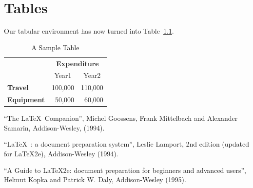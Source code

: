\documentclass[12pt,captions=tableabove]{scrbook}
\begin{document}
\appendix
\chapter{Tables}

Our tabular environment has now turned into Table~\ref{tab:sample}.

\begin{table}[htbp]
\caption{A Sample Table}
\label{tab:sample}
\centering
\begin{tabular}{lrr}
 & \multicolumn{2}{c}{\bfseries Expenditure}\\
 & \multicolumn{1}{c}{Year1} & \multicolumn{1}{c}{Year2}\\
\bfseries Travel & 100,000 & 110,000\\
\bfseries Equipment & 50,000 & 60,000
\end{tabular}
\end{table}

\begin{thebibliography}{1}
 ``The \LaTeX\ Companion'', Michel Goossens, Frank Mittelbach and
Alexander Samarin, Addison-Wesley, (1994).

 ``\LaTeX\ : a document preparation system'', Leslie Lamport,
2nd edition (updated for \LaTeX2e), Addison-Wesley (1994).

 ``A Guide to \LaTeX2e: document preparation for beginners
and advanced users'', Helmut Kopka and Patrick W. Daly, Addison-Wesley (1995).

\end{thebibliography}
\end{document}
